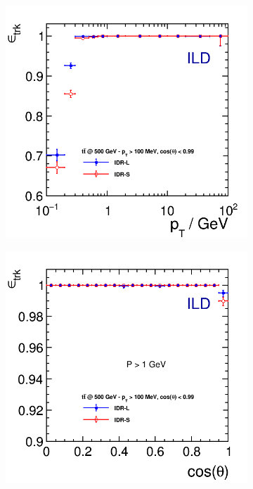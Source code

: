 \begin{figure}[htbp]
\begin{subfigure}{0.49\hsize}
 \includegraphics[width=\hsize]{Performance/fig/trkEff_pt_ttbar_IDR.png}
 \caption{  \label{fig:perf:trkeff_pt}}
 \end{subfigure}
\begin{subfigure}{0.49\hsize} 
 \includegraphics[width=\hsize]{Performance/fig/trkEff_th_ttbar_IDR.png}

\end{subfigure}
\end{figure}
